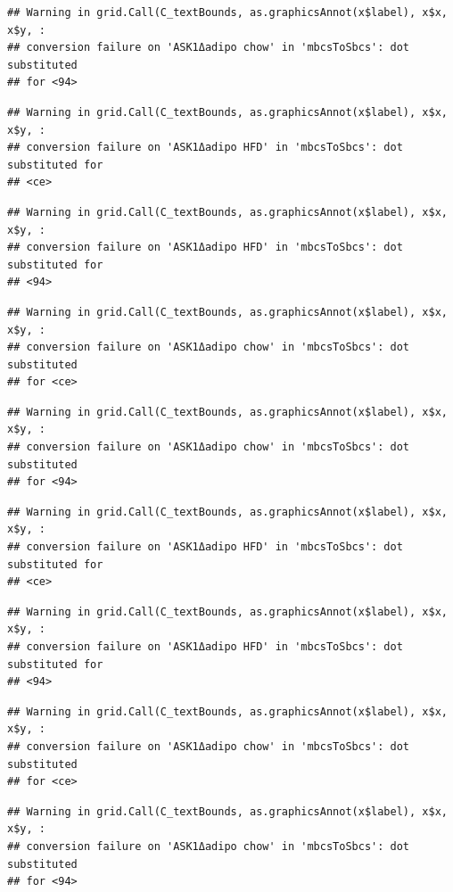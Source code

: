 \documentclass[]{book}
\begin{document}
\begin{verbatim}
## Warning in grid.Call(C_textBounds, as.graphicsAnnot(x$label), x$x, x$y, :
## conversion failure on 'ASK1Δadipo chow' in 'mbcsToSbcs': dot substituted
## for <94>
\end{verbatim}

\begin{verbatim}
## Warning in grid.Call(C_textBounds, as.graphicsAnnot(x$label), x$x, x$y, :
## conversion failure on 'ASK1Δadipo HFD' in 'mbcsToSbcs': dot substituted for
## <ce>
\end{verbatim}

\begin{verbatim}
## Warning in grid.Call(C_textBounds, as.graphicsAnnot(x$label), x$x, x$y, :
## conversion failure on 'ASK1Δadipo HFD' in 'mbcsToSbcs': dot substituted for
## <94>
\end{verbatim}

\begin{verbatim}
## Warning in grid.Call(C_textBounds, as.graphicsAnnot(x$label), x$x, x$y, :
## conversion failure on 'ASK1Δadipo chow' in 'mbcsToSbcs': dot substituted
## for <ce>
\end{verbatim}

\begin{verbatim}
## Warning in grid.Call(C_textBounds, as.graphicsAnnot(x$label), x$x, x$y, :
## conversion failure on 'ASK1Δadipo chow' in 'mbcsToSbcs': dot substituted
## for <94>
\end{verbatim}

\begin{verbatim}
## Warning in grid.Call(C_textBounds, as.graphicsAnnot(x$label), x$x, x$y, :
## conversion failure on 'ASK1Δadipo HFD' in 'mbcsToSbcs': dot substituted for
## <ce>
\end{verbatim}

\begin{verbatim}
## Warning in grid.Call(C_textBounds, as.graphicsAnnot(x$label), x$x, x$y, :
## conversion failure on 'ASK1Δadipo HFD' in 'mbcsToSbcs': dot substituted for
## <94>
\end{verbatim}

\begin{verbatim}
## Warning in grid.Call(C_textBounds, as.graphicsAnnot(x$label), x$x, x$y, :
## conversion failure on 'ASK1Δadipo chow' in 'mbcsToSbcs': dot substituted
## for <ce>
\end{verbatim}

\begin{verbatim}
## Warning in grid.Call(C_textBounds, as.graphicsAnnot(x$label), x$x, x$y, :
## conversion failure on 'ASK1Δadipo chow' in 'mbcsToSbcs': dot substituted
## for <94>
\end{verbatim}
\end{document}

